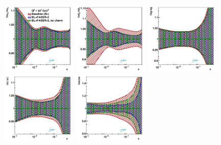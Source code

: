 \begin{figure}[htbp]
\centering
\includegraphics[width=0.32\textwidth]{plots/nuclear_fasernu2/inclusive-only_vs_inclusive+charm/statOnly_FASERv2_q2_10000_pdf_uv_ratio.pdf}
\includegraphics[width=0.32\textwidth]{plots/nuclear_fasernu2/inclusive-only_vs_inclusive+charm/statOnly_FASERv2_q2_10000_pdf_dv_ratio.pdf}
\includegraphics[width=0.32\textwidth]{plots/nuclear_fasernu2/inclusive-only_vs_inclusive+charm/statOnly_FASERv2_q2_10000_pdf_g_ratio.pdf}\\
\includegraphics[width=0.32\textwidth]{plots/nuclear_fasernu2/inclusive-only_vs_inclusive+charm/statOnly_FASERv2_q2_10000_pdf_Sea_ratio.pdf}
\includegraphics[width=0.32\textwidth]{plots/nuclear_fasernu2/inclusive-only_vs_inclusive+charm/statOnly_FASERv2_q2_10000_pdf_s_ratio.pdf}\\

\end{figure}
